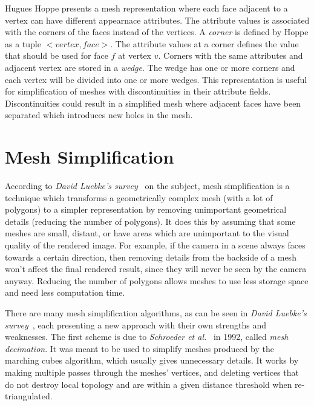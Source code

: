 Hugues Hoppe \cite{hoppe1998efficient} presents a mesh representation where each face adjacent to a vertex can have different appearnace attributes. The attribute values is associated with the corners of the faces instead of the vertices. A \emph{corner} is defined by Hoppe as a tuple $<vertex,face>$. The attribute values at a corner defines the value that should be used for face $f$ at vertex $v$. Corners with the same attributes and adjacent vertex are stored in a \emph{wedge}. The wedge has one or more corners and each vertex will be divided into one or more wedges. This representation is useful for simplification of meshes with discontinuities in their attribute fields. Discontinuities could result in a simplified mesh where adjacent faces have been separated which introduces new holes in the mesh.



\section{Mesh Simplification} \label{sec:mesh_simplification}

According to \emph{David Luebke's survey}~\cite{luebke2001developer} on the subject, mesh simplification is a technique which transforms a geometrically complex mesh (with a lot of polygons) to a simpler representation by removing unimportant geometrical details (reducing the number of polygons). It does this by assuming that some meshes are small, distant, or have areas which are unimportant to the visual quality of the rendered image. For example, if the camera in a scene always faces towards a certain direction, then removing details from the backside of a mesh won't affect the final rendered result, since they will never be seen by the camera anyway. Reducing the number of polygons allows meshes to use less storage space and need less computation time.

There are many mesh simplification algorithms, as can be seen in \emph{David Luebke's survey}~\cite{luebke2001developer}, each presenting a new approach with their own strengths and weaknesses. The first scheme is due to \emph{Schroeder et al.}~\cite{schroeder1992decimation} in 1992, called \emph{mesh decimation}. It was meant to be used to simplify meshes produced by the marching cubes algorithm, which usually gives unnecessary details. It works by making multiple passes through the meshes' vertices, and deleting vertices that do not destroy local topology and are within a given distance threshold when re-triangulated.


